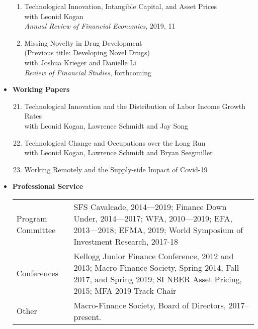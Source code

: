 \documentclass[11pt,letterpaper,serif,overlapped]{res}
\begin{document}
\begin{resume}
\begin{itemize}
\begin{enumerate}
\item Technological Innovation, Intangible Capital, and Asset Prices\\ with Leonid Kogan\\
\emph{Annual Review of Financial Economics}, 2019, 11
\item Missing Novelty in Drug Development\\(Previous title:  Developing Novel Drugs)\\with Joshua Krieger and Danielle Li\\
\emph{Review of Financial Studies}, forthcoming

\end{enumerate}
\vspace{0.5cm}
\item \textbf{Working Papers}
\begin{enumerate}
\setcounter{enumi}{20}
\item Technological Innovation and the Distribution of Labor Income Growth Rates\\ with Leonid Kogan, Lawrence Schmidt and Jay Song

\item Technological Change and Occupations over the Long Run \\with Leonid Kogan, Lawrence Schmidt and Bryan Seegmiller

\item Working Remotely and the Supply-side Impact of Covid-19
\end{enumerate}







\vspace{0.5cm}
\item \textbf{Professional Service} \\
\begin{longtable}{lp{11.5cm}}
Program Committee & SFS Cavalcade, 2014---2019; Finance Down Under,   2014---2017;  WFA,  2010---2019; EFA, 2013---2018; EFMA, 2019;  World Symposium of Investment Research, 2017-18 \\[0.2cm]
Conferences & Kellogg Junior Finance Conference,  2012 and 2013;  Macro-Finance Society, Spring 2014, Fall 2017, and Spring 2019; SI NBER Asset Pricing, 2015; MFA 2019 Track Chair\\[0.2cm]
Other & Macro-Finance Society, Board of Directors, 2017--present.
\\[0.2cm]


\end{longtable}
\end{itemize}
\end{resume}
\end{document}
